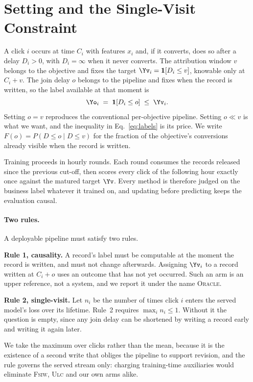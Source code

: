 \section{Setting and the Single-Visit Constraint}
\label{sec:setting}

A click $i$ occurs at time $C_i$ with features $x_i$ and, if it converts, does so after a delay
$D_i>0$, with $D_i=\infty$ when it never converts. The attribution window $v$ belongs to the
objective and fixes the target $\Yv_i=\mathbf{1}[D_i\le v]$, knowable only at $C_i+v$. The join delay $o$ belongs to the pipeline and fixes when the
record is written, so the label available at that moment is
\begin{equation}
  \Yo_i \;=\; \mathbf{1}\!\left[D_i \le o\right] \;\le\; \Yv_i .
  \label{eq:labels}
\end{equation}
Setting $o=v$ reproduces the conventional per-objective pipeline. Setting $o\ll v$ is what we
want, and the inequality in Eq.~\eqref{eq:labels} is its price. We write
$F(o)=P(D\le o\mid D\le v)$ for the fraction of the objective's conversions already visible when
the record is written.

Training proceeds in hourly rounds. Each round consumes the records released since the previous
cut-off, then scores every click of the following hour exactly once against the matured target
$\Yv$. Every method is therefore judged on the business label whatever it trained on, and
updating before predicting keeps the evaluation causal.

\paragraph{Two rules.}
A deployable pipeline must satisfy two rules.

\textbf{Rule 1, causality.} A record's label must be computable at the moment the record is
written, and must not change afterwards. Assigning $\Yv_i$ to a record written at $C_i+o$ uses
an outcome that has not yet occurred. Such an arm is an upper reference, not a system, and we
report it under the name \textsc{Oracle}.

\textbf{Rule 2, single-visit.} Let $n_i$ be the number of times click $i$ enters the served
model's loss over its lifetime. Rule~2 requires $\max_i n_i\le 1$. Without it the question is
empty, since any join delay can be shortened by writing a record early and writing it again
later.

We take the maximum over clicks rather than the mean, because it is the existence of a second
write that obliges the pipeline to support revision, and the rule governs the served stream
only: charging training-time auxiliaries would eliminate \textsc{Fsiw}, \textsc{Ulc} and our
own arms alike.

